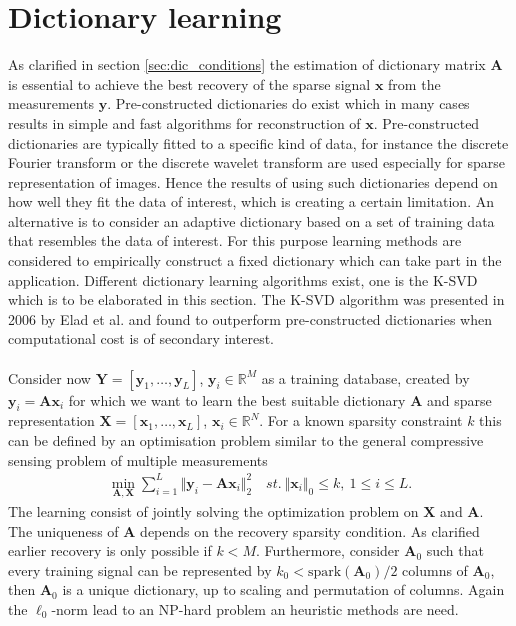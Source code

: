 \section{Dictionary learning}\label{sec:dictionarylearning}
As clarified in section \ref{sec:dic_conditions} the estimation of dictionary matrix $\textbf{A}$ is essential to achieve the best recovery of the sparse signal $\textbf{x}$ from the measurements $\textbf{y}$. Pre-constructed dictionaries do exist which in many cases results in simple and fast algorithms for reconstruction of $\textbf{x}$\cite{Elad_book}. Pre-constructed dictionaries are typically fitted to a specific kind of data, for instance the discrete Fourier transform or the discrete wavelet transform are used especially for sparse representation of images\cite{Elad_book}. Hence the results of using such dictionaries depend on how well they fit the data of interest, which is creating a certain limitation. An alternative is to consider an adaptive dictionary based on a set of training data that resembles the data of interest. For this purpose learning methods are considered to empirically construct a fixed dictionary which can take part in the application. Different dictionary learning algorithms exist, one is the K-SVD which is to be elaborated in this section. The K-SVD algorithm was presented in 2006 by Elad et al. and found to outperform pre-constructed dictionaries when computational cost is of secondary interest\cite{Elad2006}. \\
\\
Consider now $\textbf{Y}=\left[ \textbf{y}_1, \dots ,\textbf{y}_L \right]$, $\textbf{y}_i\in \mathbb{R}^{M}$ as a training database, created by $\textbf{y}_i=\textbf{A}\textbf{x}_i$ for which we want to learn the best suitable dictionary $\textbf{A}$ and sparse representation $\textbf{X}=\left[ \textbf{x}_1, \dots ,\textbf{x}_L \right]$, $\textbf{x}_i\in \mathbb{R}^{N}$. For a known sparsity constraint $k$ this can be defined by an optimisation problem similar to the general compressive sensing problem of multiple measurements \cite{Elad_book}
\begin{align}
\min_{\mathbf{A,X}} \sum_{i=1}^{L} \Vert \mathbf{y} _i - \mathbf{Ax}_i \Vert_2^2 \quad st. \ \Vert \textbf{x}_i\Vert_0\leq k, \ 1\leq i \leq L.\label{eq:SVD1}
\end{align}  
The learning consist of jointly solving the optimization problem on $\textbf{X}$ and $\textbf{A}$. The uniqueness of $\textbf{A}$ depends on the recovery sparsity condition. As clarified earlier recovery is only possible if $k < M$\cite{phd2015}. Furthermore, consider $\textbf{A}_0$ such that every training signal can be represented by $k_0 < \text{spark}(\textbf{A}_0)/2$ columns of $\textbf{A}_0$, then $\textbf{A}_0$ is a unique dictionary, up to scaling and permutation of columns\cite{Elad_book}. Again the $\ell_0$-norm lead to an NP-hard problem an heuristic methods are need.     

